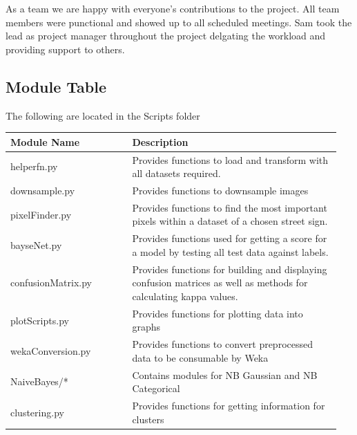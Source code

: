 \documentclass[11pt]{article}
\begin{document}
\begin{appendices}
As a team we are happy with everyone's contributions to the project. All team members were punctional and showed up to all scheduled meetings. Sam took the lead as project manager throughout the project delgating the workload and providing support to others.

\newpage
\subsection{Module Table}\label{tab:moduleTable}
The following are located in the Scripts folder
\begin{table}[ht]
    \centering
    \begin{tabular}{|p{0.35\linewidth} | p{0.6\linewidth}|} 
      \hline
      \textbf{Module Name}  & \textbf{Description} \\ \hline
      helperfn.py & Provides functions to load and transform with all datasets required. \\ \hline
      downsample.py & Provides functions to downsample images  \\ \hline
      pixelFinder.py & Provides functions to find the most important pixels within a dataset of a chosen street sign. \\ \hline
      bayseNet.py & Provides functions used for getting a score for a model by testing all test data against labels. \\ \hline
      confusionMatrix.py & Provides functions for building and displaying confusion matrices as well as methods for calculating kappa values. \\ \hline
      plotScripts.py & Provides functions for plotting data into graphs \\ \hline
      wekaConversion.py & Provides functions to convert preprocessed data to be consumable by Weka\\ \hline 
      NaiveBayes/* & Contains modules for NB Gaussian and NB Categorical \\ 
      \hline
      clustering.py & Provides functions for getting information for clusters\\
      \hline
    \end{tabular}
\end{table}



\end{appendices}
\end{document}
